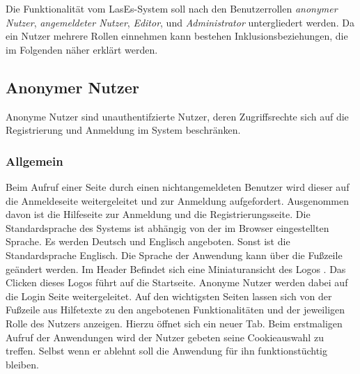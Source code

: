 
Die Funktionalität vom LasEs-System soll nach den Benutzerrollen
\emph{anonymer Nutzer}, \emph{angemeldeter Nutzer}, \emph{Editor}, und
\emph{Administrator} untergliedert werden. Da ein Nutzer mehrere Rollen einnehmen
kann bestehen Inklusionsbeziehungen, die im Folgenden näher erklärt werden.

\subsection{Anonymer Nutzer}
Anonyme Nutzer sind unauthentifzierte Nutzer, deren Zugriffsrechte sich
auf die Registrierung und Anmeldung im System beschränken.

\subsubsection{Allgemein}
\begin{description}
     Beim Aufruf einer Seite durch einen nichtangemeldeten Benutzer
    wird dieser auf die Anmeldeseite weitergeleitet und zur
    Anmeldung aufgefordert. Ausgenommen davon ist die Hilfeseite zur Anmeldung und die
    Registrierungsseite.
     Die Standardsprache des Systems ist abhängig von der im Browser
    eingestellten Sprache. Es werden Deutsch und Englisch angeboten.
    Sonst ist die Standardsprache Englisch. Die Sprache der Anwendung kann über die
    Fußzeile geändert werden.
     Im Header Befindet sich eine Miniaturansicht des Logos . Das Clicken dieses Logos führt auf die Startseite. Anonyme Nutzer werden dabei auf die Login Seite weitergeleitet.
     Auf den wichtigsten Seiten lassen sich von der Fußzeile aus
    Hilfetexte zu den angebotenen Funktionalitäten und der jeweiligen Rolle
    des Nutzers anzeigen. Hierzu öffnet sich ein neuer Tab.
     Beim erstmaligen Aufruf der Anwendungen wird der Nutzer gebeten
    seine Cookieauswahl zu treffen. Selbst wenn er ablehnt soll die Anwendung
    für ihn funktionstüchtig bleiben.
\end{description}

